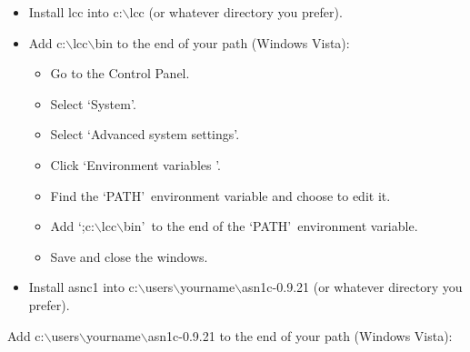 \documentclass{article}
\begin{document}
\begin{itemize}
\item
Install lcc into c:$\backslash$lcc (or whatever directory you prefer).
\item
Add c:$\backslash$lcc$\backslash$bin to the end of your path (Windows Vista):
\begin{itemize}
\item
Go to the Control Panel.
\item
Select \lq System\rq .
\item
Select \lq Advanced system settings\rq .
\item
Click \lq Environment variables \rq .
\item
Find the \lq PATH\rq\ environment variable and choose to edit it.
\item
Add \lq ;c:$\backslash$lcc$\backslash$bin\rq\ to the end of the \lq PATH\rq\ environment variable.
\item
Save and close the windows.
\end{itemize}
\item
Install asnc1 into 
c:$\backslash$users$\backslash$yourname$\backslash$asn1c-0.9.21
(or whatever directory you prefer).
\end{itemize}
\item
Add c:$\backslash$users$\backslash$yourname$\backslash$asn1c-0.9.21
to the end of your path (Windows Vista):
\end{document}
